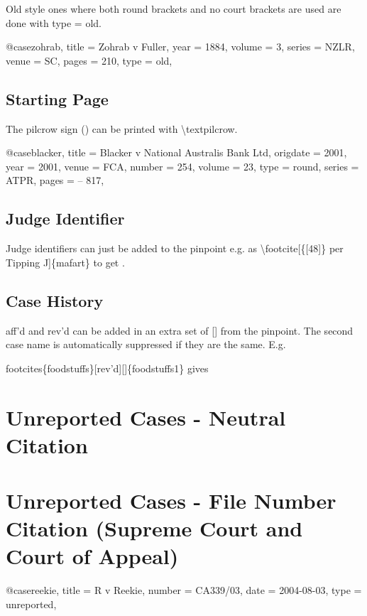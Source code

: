 \documentclass{book}
\newcommand{\s}{\textbackslash}
\begin{document}
Old style ones where both round brackets and no court brackets are used are done with type = {old}.
\begin{bib}
@case{zohrab,
title = {Zohrab v Fuller},
year = {1884},
volume = {3},
series = {NZLR},
venue = {SC},
pages = {210},
type = {old},
}
\end{bib}

\subsection{Starting Page}

The pilcrow sign (\textparagraph) can be printed with {\s}textpilcrow.

\begin{bib}
@case{blacker,
title = {Blacker v National Australis Bank Ltd},
origdate = {2001},
year = {2001},
venue = {FCA},
number = {254},
volume = {23},
type = {round},
series = {ATPR},
pages = {-- 817},
}
\end{bib}

\subsection{Judge Identifier}

Judge identifiers can just be added to the pinpoint e.g. as {\s}footcite[\{[48]\} per Tipping J]\{mafart\} to get \cite[{[48]} per Tipping J]{mafart}.

\subsection{Case History}
aff'd and rev'd can be added in an extra set of [] from the pinpoint. The second case name is automatically suppressed if they are the same.  E.g. 


\noindent{\s}footcites\{foodstuffs\}[rev'd][]\{foodstuffs1\} gives
\cites{foodstuffs}[rev'd][]{foodstuffs1}


\section{Unreported Cases - Neutral Citation}



\section{Unreported Cases - File Number Citation (Supreme Court and Court of Appeal)}

\begin{bib}
@case{reekie,
title = {R v Reekie},
number = {CA339/03},
date = {2004-08-03},
type = {unreported},
}
\end{bib}
\end{document}
